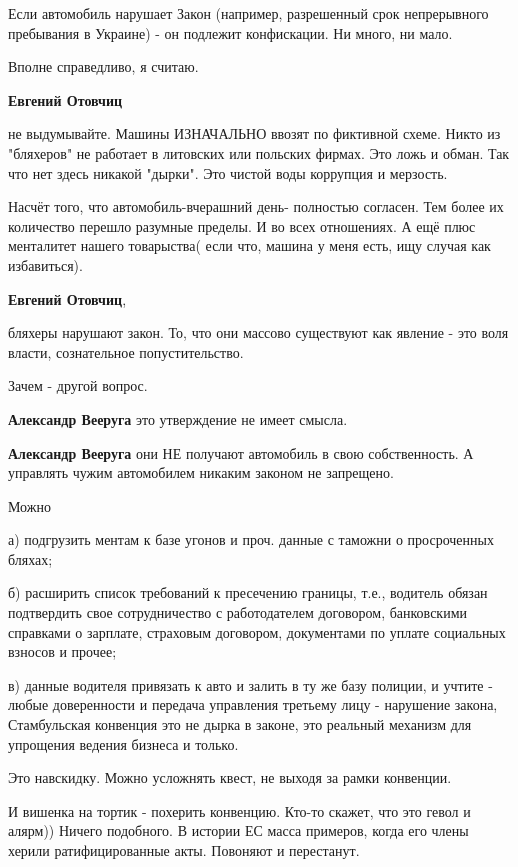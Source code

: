 \begin{itemize}
\begin{itemize}
Если автомобиль нарушает Закон (например, разрешенный срок непрерывного
пребывания в Украине) - он подлежит конфискации. Ни много, ни мало.

Вполне справедливо, я считаю.

\textbf{Евгений Отовчиц} 

не выдумывайте. Машины ИЗНАЧАЛЬНО ввозят по фиктивной схеме. Никто из
"бляхеров" не работает в литовских или польских фирмах. Это ложь и обман. Так
что нет здесь никакой "дырки". Это чистой воды коррупция и мерзость.


Насчёт того, что автомобиль-вчерашний день- полностью согласен. Тем более их
количество перешло разумные пределы. И во всех отношениях. А ещё плюс менталитет
нашего товарыства( если что, машина у меня есть, ищу случая как избавиться).

\textbf{Евгений Отовчиц}, 

бляхеры нарушают закон. То, что они массово существуют как явление - это воля
власти, сознательное попустительство.

Зачем - другой вопрос.

\textbf{Александр Вееруга} это утверждение не имеет смысла.

\textbf{Александр Вееруга} они НЕ получают автомобиль в свою собственность. А управлять чужим автомобилем никаким законом не запрещено.


Можно

а) подгрузить ментам к базе угонов и проч. данные с таможни о просроченных
бляхах;

б) расширить список требований к пресечению границы, т.е., водитель обязан
подтвердить свое сотрудничество с работодателем договором, банковскими
справками о зарплате, страховым договором, документами по уплате социальных
взносов и прочее;

в) данные водителя привязать к авто и залить в ту же базу полиции, и учтите -
любые доверенности и передача управления третьему лицу - нарушение закона,
Стамбульская конвенция это не дырка в законе, это реальный механизм для
упрощения ведения бизнеса и только.

Это навскидку. Можно усложнять квест, не выходя за рамки конвенции.

И вишенка на тортик - похерить конвенцию. Кто-то скажет, что это гевол и
алярм)) Ничего подобного. В истории ЕС масса примеров, когда его члены херили
ратифицированные акты. Повоняют и перестанут.



\end{itemize}
\end{itemize}
